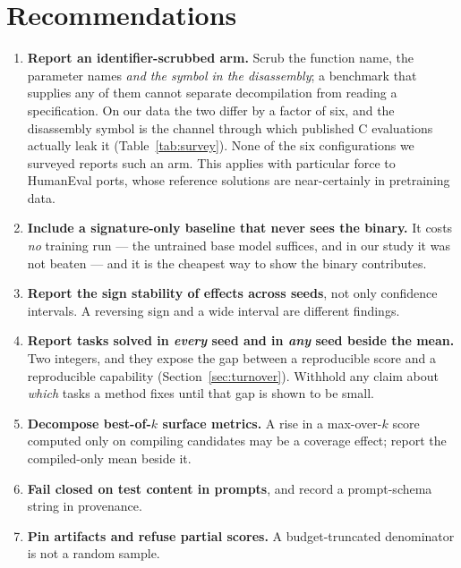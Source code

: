 \documentclass[conference]{IEEEtran}
\begin{document}
\section{Recommendations}
\label{sec:protocol}
\begin{enumerate}[leftmargin=*,topsep=2pt,itemsep=1pt]
\item \textbf{Report an identifier-scrubbed arm.} Scrub the function name, the
parameter names \emph{and the symbol in the disassembly}; a benchmark that
supplies any of them cannot separate decompilation from reading a specification.
On our data the two differ by a factor of six, and the disassembly symbol is the
channel through which published C evaluations actually leak it
(Table~\ref{tab:survey}). None of the six configurations we surveyed reports such
an arm. This applies with particular force to HumanEval ports, whose reference
solutions are near-certainly in pretraining data.
\item \textbf{Include a signature-only baseline that never sees the binary.} It
costs \emph{no} training run --- the untrained base model suffices, and in our
study it was not beaten --- and it is the cheapest way to show the binary
contributes.
\item \textbf{Report the sign stability of effects across seeds}, not only
confidence intervals. A reversing sign and a wide interval are different
findings.
\item \textbf{Report tasks solved in \emph{every} seed and in \emph{any} seed
beside the mean.} Two integers, and they expose the gap between a reproducible
score and a reproducible capability (Section~\ref{sec:turnover}). Withhold any
claim about \emph{which} tasks a method fixes until that gap is shown to be
small.
\item \textbf{Decompose best-of-$k$ surface metrics.} A rise in a max-over-$k$
score computed only on compiling candidates may be a coverage effect; report the
compiled-only mean beside it.
\item \textbf{Fail closed on test content in prompts}, and record a
prompt-schema string in provenance.
\item \textbf{Pin artifacts and refuse partial scores.} A budget-truncated
denominator is not a random sample.
\end{enumerate}
\end{document}
